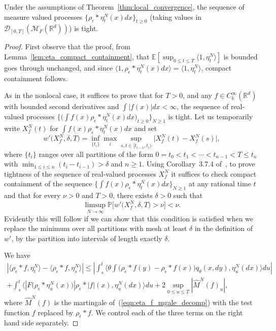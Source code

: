 \documentclass[EJP]{ejpecp} %
\newcommand{\IP}{\mathbb P}
\newcommand{\IE}{\mathbb E}
\newcommand{\IR}{\mathbb R}
\newcommand{\measures}{\mathcal{M}_F(\IR^d)} %
\begin{document}
\begin{corollary}
\label{lem:density_tightness} 
Under the assumptions of Theorem~\ref{thm:local_convergence},
the sequence of measure valued processes $\{ \rho_\epsilon*\eta_t^N(x) dx \}_{t \geq 0}$
	(taking values in ${\mathcal D}_{[0,T]}(\measures)$) is tight.
\end{corollary}
\begin{proof}

First observe that the proof, from Lemma~\ref{lem:eta_compact_containment}, 
that 
$\IE[\sup_{0\leq t\leq T} \langle 1,\eta_t^N\rangle]$ is 
bounded goes through unchanged, and since 
$\langle 1, \rho_\epsilon*\eta_t^N(x)dx\rangle=\langle 1, \eta_t^N\rangle$,  
compact containment follows.
 
As in the nonlocal case, it suffices to prove that for $T>0$,
and any $f\in C_b^\infty (\IR^d)$ with bounded second derivatives
and $\int|f(x)|dx < \infty$, the sequence of real-valued processes 
$\big\{\big(\int f(x)\rho_\epsilon*\eta_t^N(x)dx\big)_{t\geq 0}\big\}_{N\geq 1}$ is tight.  
Let us temporarily write $X_f^N(t)$ for $\int f(x)\rho_\epsilon*\eta_t^N(x)dx$
and set
\[
w'\big(X_f^N,\delta,T\big)= \inf_{\{t_i\}}\max_i\sup_{s,t\in [t_{i-1},t_i)}
\big| X_f^N(t)-X_f^N(s)\big|,
\]
where $\{t_i\}$ ranges over all partitions of the form 
$0=t_0<t_1<\cdots <t_{n-1}<T\leq t_n$ with 
$\min_{1\leq i\leq n}(t_i-t_{i-1})>\delta$ and $n\geq 1$.
Using Corollary~3.7.4 of~\cite{ethier/kurtz:1986}, 
to prove tightness
of the sequence of real-valued processes $X_f^N$
it suffices to check compact containment of 
    the sequence $\{\int f(x) \rho_\epsilon*\eta_t^N(x)dx\}_{N\geq 1}$ at any rational time $t$ and
that for every $\nu>0$ and $T>0$, there exists $\delta>0$ such that
\[
\limsup_{N\to\infty}\IP\big[w'\big(X_f^N,\delta,T\big)>\nu\big]<\nu.
\]
Evidently this will follow 
if we can show that this condition is satisfied when we replace the 
minimum over all partitions with mesh at least $\delta$ in the 
definition of $w'$, by the partition into
intervals of length exactly $\delta$.

We have
\begin{multline}
\label{tightness estimate}
\left|
\langle \rho_{\epsilon} * f, \eta_t^N \rangle 
- \langle \rho_{\epsilon} * f, \eta_s^N \rangle            
\right|
\leq
\left|
\int_s^t\Big\langle\theta\int\big(\rho_\epsilon*f(y)-\rho_\epsilon*f(x)\big)
q_{\theta}(x,dy),\eta_u^N(dx)\Big\rangle du
\right|
\\
+\int_s^t\Big\langle |F\big(\rho_\epsilon*\eta_u^N(x)\big)|\rho_\epsilon*|f|(x), 
\eta_u^N(dx)\Big\rangle du +2\sup_{0\leq u\leq T}|\widehat{M}^N(f)_u|,
\end{multline}
where $\widehat{M}^N(f)$ is the martingale of~(\ref{eqn:eta_f_mgale_decomp})
with the test function $f$ replaced by $\rho_\epsilon*f$. 
We control each of the three terms on the right hand side separately.


\end{proof}
\end{document}
